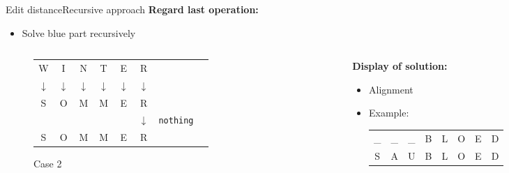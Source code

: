 \begin{frame}{Edit distance}{Recursive approach}
  \textbf{Regard last operation:}
  \begin{itemize}
    \item<2->
      Solve {\color{Mittel-Blau}blue} part recursively
  \end{itemize}
  \begin{columns}
    \begin{column}{0.3\linewidth}
      \begin{figure}[!h]
        \begin{center}
          \begin{tabular}{c@{}c@{}c@{}c@{}c@{}c@{}c@{}l}
            \color{Mittel-Blau}W & \color{Mittel-Blau}I & \color{Mittel-Blau}N &
            \color{Mittel-Blau}T & \color{Mittel-Blau}E & \color{Mittel-Blau}R\\
            \color{Mittel-Blau}$\downarrow$ & \color{Mittel-Blau}$\downarrow$ &
            \color{Mittel-Blau}$\downarrow$ & \color{Mittel-Blau}$\downarrow$ &
            \color{Mittel-Blau}$\downarrow$ & \color{Mittel-Blau}$\downarrow$\\
            \color{Mittel-Blau}S & \color{Mittel-Blau}O & \color{Mittel-Blau}M &
            \color{Mittel-Blau}M & \color{Mittel-Blau}E & \color{Mittel-Blau}R\\
            {} & {} & {} & {} & {} & $\downarrow$ & \texttt{nothing}\\
            S & O & M & M & E & R
          \end{tabular}
        \end{center}
        \caption{Case 2}
      \end{figure}
    \end{column}
    \begin{column}{0.5\linewidth}
      \textbf{Display of solution:}
      \begin{itemize}
        \item
          Alignment
        \item
          Example:
          \begin{tabular}{cccccccc}
            \_ & \_ & \_ & B & L & O & E & D\\
            S & A & U & B & L & O & E & D
          \end{tabular}
      \end{itemize}
    \end{column}
  \end{columns}
\end{frame}

